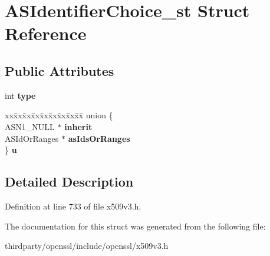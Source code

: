 \hypertarget{struct_a_s_identifier_choice__st}{}\section{A\+S\+Identifier\+Choice\+\_\+st Struct Reference}
\label{struct_a_s_identifier_choice__st}
\subsection*{Public Attributes}
\begin{DoxyCompactItemize}
\item 
\mbox{\label{struct_a_s_identifier_choice__st_a370e530aebd1097c5f216cf0ae19b170}} 
int {\bfseries type}
\item 
\mbox{\label{struct_a_s_identifier_choice__st_ac8a6ffc319abbdfe0c13477b8f2581f9}} 
\begin{tabbing}
xx\=xx\=xx\=xx\=xx\=xx\=xx\=xx\=xx\=\kill
union \{\\
\>ASN1\_NULL $\ast$ {\bfseries inherit}\\
\>ASIdOrRanges $\ast$ {\bfseries asIdsOrRanges}\\
\} {\bfseries u}\\

\end{tabbing}\end{DoxyCompactItemize}


\subsection{Detailed Description}


Definition at line 733 of file x509v3.\+h.



The documentation for this struct was generated from the following file\+:\begin{DoxyCompactItemize}
\item 
thirdparty/openssl/include/openssl/x509v3.\+h\end{DoxyCompactItemize}
